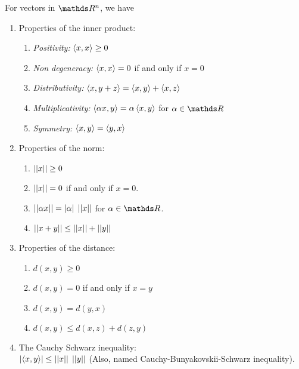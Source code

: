 \documentclass[../main-sheet.tex]{subfiles}
\begin{document}
\begin{thm}
    For vectors in $ \R^n $, we have
    \begin{enumerate}
        \item Properties of the inner product:
        \begin{enumerate}[label=(\roman*)]
            \item \emph{Positivity:} $ \left<x,x\right>\geq 0 $
            \item \emph{Non degeneracy:} $ \left<x,x\right>= 0 $ if and only if $ x=0 $
            \item \emph{Distributivity:} $ \left<x,y+z\right>= \left<x,y\right>+\left<x,z\right> $
            \item \emph{Multiplicativity:} $ \left<\alpha x,y\right>= \alpha \left<x,y\right>$ for $ \alpha\in\R $
            \item \emph{Symmetry:} $ \left<x,y\right>= \left<y,x\right>$
        \end{enumerate}
        \item Properties of the norm:
        \begin{enumerate}[label=(\roman*)]
            \item $ \left\vert\left\vert x\right\vert\right\vert\geq 0 $
            \item $ \left\vert\left\vert x\right\vert\right\vert=0 $ if and only if $ x=0 $.
            \item $ \left\vert\left\vert\alpha x\right\vert\right\vert=\left\vert\alpha\right\vert\;\left\vert\left\vert x\right\vert\right\vert  $ for $ \alpha \in \R $.
            \item $ \left\vert\left\vert x+y\right\vert\right\vert\leq \left\vert\left\vert x\right\vert\right\vert+\left\vert\left\vert y\right\vert\right\vert $
        \end{enumerate}
        \item Properties of the distance:
        \begin{enumerate}[label=(\roman*)]
            \item $ d(x,y)\geq 0 $   
            \item $ d(x,y)=0 $ if and only if $ x=y$
            \item $ d(x,y)=d(y,x) $
            \item $ d(x,y)\leq d(x,z)+d(z,y) $
        \end{enumerate}
        \item The Cauchy Schwarz inequality:\\
        $ \left\vert\left<x,y\right>\right\vert\leq \left\vert\left\vert x\right\vert\right\vert\;\left\vert\left\vert y\right\vert\right\vert $ (Also, named Cauchy-Bunyakovskii-Schwarz inequality).
    \end{enumerate}
\end{thm}
\end{document}
